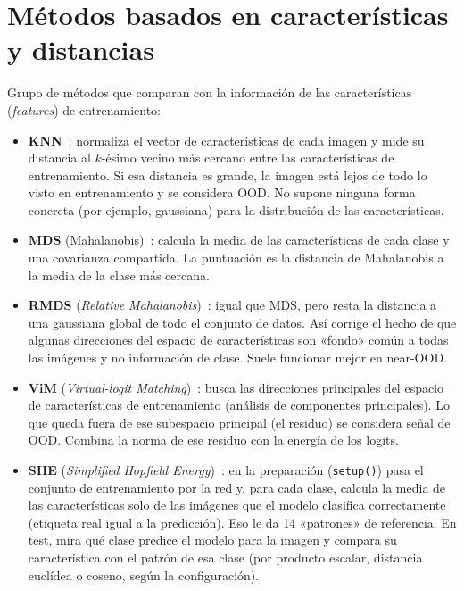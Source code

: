\section{Métodos basados en características y distancias}\label{sec:metodos-caracteristicas}

Grupo de métodos que comparan con la información de las características (\emph{features}) de entrenamiento:

\begin{itemize}
  \item \textbf{KNN}~\cite{sun2022knn}: normaliza el vector de características de cada imagen y mide su distancia al $k$-ésimo vecino más cercano entre las características de entrenamiento. Si esa distancia es grande, la imagen está lejos de todo lo visto en entrenamiento y se considera OOD. No supone ninguna forma concreta (por ejemplo, gaussiana) para la distribución de las características.
  \item \textbf{MDS} (Mahalanobis)~\cite{lee2018}: calcula la media de las características de cada clase y una covarianza compartida. La puntuación es la distancia de Mahalanobis a la media de la clase más cercana.
  \item \textbf{RMDS} (\emph{Relative Mahalanobis})~\cite{ren2021}: igual que MDS, pero resta la distancia a una gaussiana global de todo el conjunto de datos. Así corrige el hecho de que algunas direcciones del espacio de características son «fondo» común a todas las imágenes y no información de clase. Suele funcionar mejor en near-OOD.
  \item \textbf{ViM} (\emph{Virtual-logit Matching})~\cite{wang2022vim}: busca las direcciones principales del espacio de características de entrenamiento (análisis de componentes principales). Lo que queda fuera de ese subespacio principal (el residuo) se considera señal de OOD. Combina la norma de ese residuo con la energía de los logits.
  \item \textbf{SHE} (\emph{Simplified Hopfield Energy})~\cite{zhang2023she}: en la preparación (\texttt{setup()}) pasa el conjunto de entrenamiento por la red y, para cada clase, calcula la media de las características solo de las imágenes que el modelo clasifica correctamente (etiqueta real igual a la predicción). Eso le da 14 «patrones» de referencia. En test, mira qué clase predice el modelo para la imagen y compara su característica con el patrón de esa clase (por producto escalar, distancia euclídea o coseno, según la configuración).
\end{itemize}


